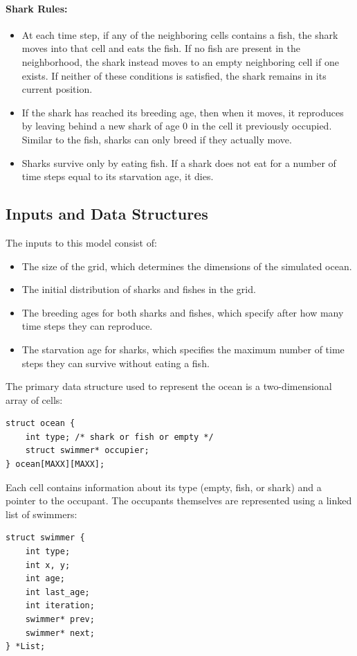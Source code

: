 \documentclass[12pt]{book}
\begin{document}
\paragraph{Shark Rules:}
\begin{itemize}
    \item At each time step, if any of the neighboring cells contains a fish, the shark moves into that cell and eats the fish. If no fish are present in the neighborhood, the shark instead moves to an empty neighboring cell if one exists. If neither of these conditions is satisfied, the shark remains in its current position.
    \item If the shark has reached its breeding age, then when it moves, it reproduces by leaving behind a new shark of age $0$ in the cell it previously occupied. Similar to the fish, sharks can only breed if they actually move.
    \item Sharks survive only by eating fish. If a shark does not eat for a number of time steps equal to its starvation age, it dies.
\end{itemize}

\subsection*{Inputs and Data Structures}
The inputs to this model consist of:
\begin{itemize}
    \item The size of the grid, which determines the dimensions of the simulated ocean.
    \item The initial distribution of sharks and fishes in the grid.
    \item The breeding ages for both sharks and fishes, which specify after how many time steps they can reproduce.
    \item The starvation age for sharks, which specifies the maximum number of time steps they can survive without eating a fish.
\end{itemize}

The primary data structure used to represent the ocean is a two-dimensional array of cells:
\begin{lstlisting}[style=cppstyle]
struct ocean {
    int type; /* shark or fish or empty */
    struct swimmer* occupier;
} ocean[MAXX][MAXX];
\end{lstlisting}

Each cell contains information about its type (empty, fish, or shark) and a pointer to the occupant. The occupants themselves are represented using a linked list of swimmers:
\begin{lstlisting}[style=cppstyle]
struct swimmer {
    int type;
    int x, y;
    int age;
    int last_age;
    int iteration;
    swimmer* prev;
    swimmer* next;
} *List;
\end{lstlisting}
\end{document}
